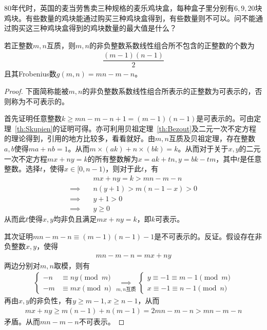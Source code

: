 \begin{example}
  $80$年代时，英国的麦当劳售卖三种规格的麦乐鸡块盒，每种盒子里分别有$6,9,20$块鸡块。有些数量的鸡块能通过购买三种鸡块盒得到，有些数量则不可以。问不能通过购买这三种鸡块盒得到的鸡块数量的最大值是什么？
\end{example}

\begin{theorem}
  若正整数$m,n$互质，则$m,n$的非负整数系数线性组合所不包含的正整数的个数为
  \begin{align*}
    \dfrac{(m-1)(n-1)}2
  \end{align*}
  且其Frobenius数$g(m,n)=mn-m-n$。
\end{theorem}
\begin{proof}下面简称能被$m,n$的非负整数系数线性组合所表示的正整数为可表示的，否则称为不可表示的。
  
  首先证明任意整数$k\ge mn-m-n+1=(m-1)(n-1)$是可表示的。可由定理~\ref{th:Skupien}的证明可得。亦可利用贝祖定理~\ref{th:Bezout}及二元一次不定方程的理论得到，引用的地方比较多，看看就好。由$m,n$互质及贝祖定理，存在整数$a,b$使得$ma+nb=1$。从而$m\times(ak)+n\times(bk)=k$。从而对于关于$x,y$的二元一次不定方程$mx+ny=k$的所有整数解为$x=ak+tn, y=bk-tm$，其中$t$是任意整数。选择$t$，使得$x\in[0,n-1)$，则对于此$t$，有
  \begin{align*}
    &mx + ny = k > mn -m -n \\
    \implies\quad& n(y+1)>m(n-1-x)>0\\
                                            \implies\quad&y+1>0\\
    \implies\quad& y\ge0    
  \end{align*}
  从而此$t$使得$x,y$均非负且满足$mx+ny=k$，即$k$可表示。


  其次证明$mn-m-n\equiv (m-1)(n-1)-1$是不可表示的。反证。假设存在非负整数$x,y$，使得
  \begin{align*}
    mn-m-n=mx+ny
  \end{align*}
  两边分别对$m,n$取模，则有
  \begin{align*}
    \begin{cases}
      -n&\equiv ny\pmod m\\
      -m&\equiv mx\pmod n
    \end{cases}
    \underset{m,n\text{互质}}{\implies}
    \begin{cases}
      y\equiv -1\equiv m-1 \pmod m\\
      x\equiv -1\equiv n-1 \pmod n
    \end{cases}
  \end{align*}
  再由$x,y$的非负性，有$y\ge m-1, x\ge n-1$，从而
  \begin{align*}
    mx + ny\ge m(n-1) + n(m-1) = 2mn -m -n > mn - m -n
  \end{align*}
  矛盾。从而$mn-m-n$不可表示。


\end{proof}
